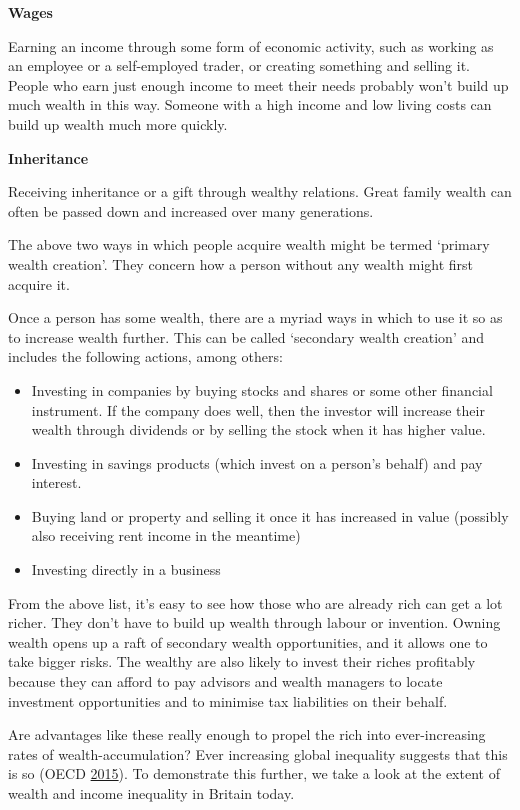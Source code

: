 \documentclass[]{tufte-handout}
\providecommand{\tightlist}{%
  \setlength{\itemsep}{0pt}\setlength{\parskip}{0pt}}
\begin{document}
\textbf{Wages}

Earning an income through some form of economic activity, such as
working as an employee or a self-employed trader, or creating something
and selling it. People who earn just enough income to meet their needs
probably won't build up much wealth in this way. Someone with a high
income and low living costs can build up wealth much more quickly.

\textbf{Inheritance }

Receiving inheritance or a gift through wealthy relations. Great family
wealth can often be passed down and increased over many generations.

The above two ways in which people acquire wealth might be termed
`primary wealth creation'. They concern how a person without any wealth
might first acquire it.

Once a person has some wealth, there are a myriad ways in which to use
it so as to increase wealth further. This can be called `secondary
wealth creation' and includes the following actions, among others:

\begin{itemize}
\tightlist
\item
  Investing in companies by buying stocks and shares or some other
  financial instrument. If the company does well, then the investor will
  increase their wealth through dividends or by selling the stock when
  it has higher value.
\item
  Investing in savings products (which invest on a person's behalf) and
  pay interest.
\item
  Buying land or property and selling it once it has increased in value
  (possibly also receiving rent income in the meantime)
\item
  Investing directly in a business
\end{itemize}

From the above list, it's easy to see how those who are already rich can
get a lot richer. They don't have to build up wealth through labour or
invention. Owning wealth opens up a raft of secondary wealth
opportunities, and it allows one to take bigger risks. The wealthy are
also likely to invest their riches profitably because they can afford to
pay advisors and wealth managers to locate investment opportunities and
to minimise tax liabilities on their behalf.

Are advantages like these really enough to propel the rich into
ever-increasing rates of wealth-accumulation? Ever increasing global
inequality suggests that this is so (OECD
\protect\hyperlink{ref-OECD2015}{2015}). To demonstrate this further, we
take a look at the extent of wealth and income inequality in Britain
today.
\end{document}
